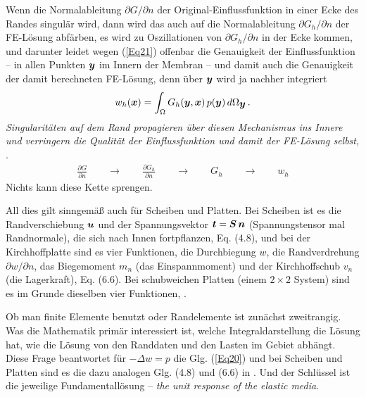 {Wenn die Normalableitung $\partial G/\partial n$ der Original-Einflussfunktion in einer Ecke des Randes singul\"{a}r wird, dann wird das auch auf die Normalableitung $\partial G_h/\partial n$ der FE-L\"{o}sung abf\"{a}rben, es wird zu Oszillationen von $\partial G_h/\partial n$ in der Ecke kommen, und darunter leidet wegen (\ref{Eq21}) offenbar die Genauigkeit der Einflussfunktion -- in allen Punkten $\mbox{\boldmath $y$}$ im Innern der Membran -- und damit auch die Genauigkeit der damit berechneten FE-L\"{o}sung, denn \"{u}ber $\mbox{\boldmath $y$}$ wird ja nachher integriert
\begin{align}
w_h(\mbox{\boldmath $x$}) = \int_{\Omega} G_h(\mbox{\boldmath $y$}, \mbox{\boldmath $x$})\,p(\mbox{\boldmath $y$})\,d\Omega_{\mbox{\boldmath $y$}}\,.
\end{align}
{\em Singularit\"{a}ten auf dem Rand propagieren \"{u}ber diesen Mechanismus ins Innere und verringern die Qualit\"{a}t der Einflussfunktion und damit der FE-L\"{o}sung selbst, \cite{HaJa2}\/}.
\begin{align}
\frac{\partial G}{\partial n} \qquad \to \qquad \frac{\partial G_h}{\partial n}  \qquad \to \qquad G_h \qquad \to \qquad w_h
\end{align}
Nichts kann diese Kette sprengen.

All dies gilt sinngem\"{a}{\ss} auch f\"{u}r Scheiben und Platten. Bei Scheiben ist es die Randverschiebung $\mbox{\boldmath $u$}$ und der Spannungsvektor $\mbox{\boldmath $t$} = \mbox{\boldmath $S$}\,\mbox{\boldmath $n$}$ (Spannungstensor mal Randnormale), die sich nach Innen fortpflanzen, \cite{Ha3} Eq. (4.8), und bei der Kirchhoffplatte sind es vier Funktionen, die Durchbiegung $w$, die Randverdrehung $\partial w/\partial n$, das Biegemoment $m_n$ (das Einspannmoment) und der Kirchhoffschub $v_n$ (die Lagerkraft), \cite{Ha3} Eq. (6.6). Bei schubweichen Platten (einem $2 \times 2$ System) sind es im Grunde dieselben vier Funktionen, \cite{HaJa2}.

Ob man finite Elemente benutzt oder Randelemente ist zun\"{a}chst zweitrangig. Was die Mathematik prim\"{a}r interessiert ist, welche Integraldarstellung die L\"{o}sung hat, wie die L\"{o}sung von den Randdaten und den Lasten im Gebiet abh\"{a}ngt. Diese Frage beantwortet f\"{u}r $-\Delta w = p$ die Glg. (\ref{Eq20}) und bei Scheiben und Platten sind es die dazu analogen Glg. (4.8) und (6.6) in \cite{Ha3}. Und der Schl\"{u}ssel ist die jeweilige Fundamentall\"{o}sung -- {\em the unit response of the elastic media\/}.\\


}

